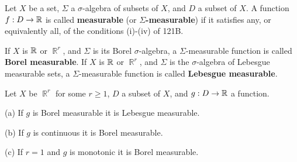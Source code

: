  Let $X$ be a set, $\Sigma$ a $\sigma$-algebra
of subsets of $X$, and $D$ a subset of $X$.   A function $f:D\to\Bbb R$
is called {\bf measurable} (or {\bf $\Sigma$-measurable}) if it
satisfies any, or equivalently all, of the conditions (i)-(iv) of 121B.
     
If $X$ is $\Bbb R$ or $\BbbR^r$, and $\Sigma$ is its Borel
$\sigma$-algebra, a $\Sigma$-measurable function is
called {\bf Borel measurable}.   If $X$ is $\Bbb R$ or $\BbbR^r$, and 
$\Sigma$ is
the $\sigma$-algebra of Lebesgue measurable sets,
a $\Sigma$-measurable function is called {\bf Lebesgue measurable}.
     
     
 Let $X$ be $\BbbR^r$ for some $r\ge 1$, $D$
a subset of $X$, and $g:D\to\Bbb R$ a function.
     
(a) If $g$ is Borel measurable it is Lebesgue measurable.
     
(b) If $g$ is continuous it is Borel measurable.
     
(c) If $r=1$ and $g$ is monotonic it is Borel measurable.
     
